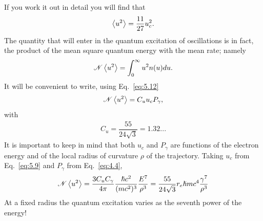  If you work it out in detail you will find that
\begin{align}
	\left< u^2 \right> = \dfrac{11}{27} u_c^2.
\end{align}
The quantity that will enter in the quantum excitation of oscillations is in fact, the product of the mean square quantum energy with the mean rate; namely
\begin{align} \label{eq:5.17}
	\mathscr{N} \left< u^2 \right> = \int_0^\infty u^2 n(u) du.
\end{align}
It will be convenient to write, using Eq.~\eqref{eq:5.12}
\begin{align} \label{eq:5.18}
	\mathscr{N} \left< u^2 \right> = C_u u_c P_\gamma,
\end{align}
with
\begin{align}
	C_u = \dfrac{55}{24\sqrt{3}} = 1.32...
\end{align}
It is important to keep in mind that both $u_c$ and $P_\gamma$ are functions of the electron
energy and of the local radius of curvature $\rho$ of the trajectory. Taking $u_c$ from Eq.~\eqref{eq:5.9} and $P_\gamma$ from Eq.~\eqref{eq:4.4},
\begin{align}
	\mathscr{N} \left< u^2 \right> = \dfrac{3 C_u C_\gamma}{4 \pi} \dfrac{\hslash c^2}{(mc^2)^3} \dfrac{E^7}{\rho^3} = \dfrac{55}{24\sqrt{3}} r_e \hslash mc^4 \dfrac{\gamma^7}{\rho^3}
\end{align}
At a fixed radius the quantum excitation varies as the seventh power of the energy!
